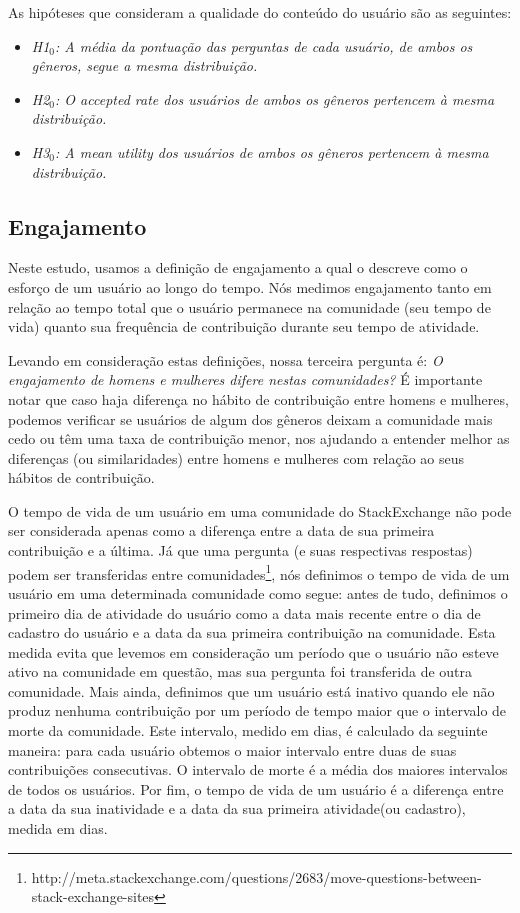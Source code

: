 
As hipóteses que consideram a qualidade do conteúdo do usuário são as seguintes:

\begin{itemize}
    \item \textit{H1$_0$: A média da pontuação das perguntas de cada usuário, de ambos os gêneros, segue a mesma distribuição.}
    \item \textit{H2$_0$: O accepted rate dos usuários de ambos os gêneros pertencem à mesma distribuição.}
    \item \textit{H3$_0$: A mean utility dos usuários de ambos os gêneros pertencem à mesma distribuição.}
\end{itemize}

\subsection{Engajamento}

Neste estudo, usamos a definição de engajamento a qual o descreve como o esforço de um usuário ao longo do tempo. Nós medimos engajamento tanto em relação ao tempo total que o usuário permanece na comunidade (seu tempo de vida) quanto sua frequência de contribuição durante seu tempo de atividade.

Levando em consideração estas definições, nossa terceira pergunta é: \textit{O engajamento de homens e mulheres difere nestas comunidades?} É importante notar que caso haja diferença no hábito de contribuição entre homens e mulheres, podemos verificar se usuários de algum dos gêneros deixam a comunidade mais cedo ou têm uma taxa de contribuição menor, nos ajudando a entender melhor as diferenças (ou similaridades) entre homens e mulheres com relação ao seus hábitos de contribuição.

O tempo de vida de um usuário em uma comunidade do StackExchange não pode ser considerada apenas como a diferença entre a data de sua primeira contribuição e a última. Já que uma pergunta (e suas respectivas respostas) podem ser transferidas entre comunidades\footnote{http://meta.stackexchange.com/questions/2683/move-questions-between-stack-exchange-sites}, nós definimos o tempo de vida de um usuário em uma determinada comunidade como segue: antes de tudo, definimos o primeiro dia de atividade do usuário como a data mais recente entre o dia de cadastro do usuário e a data da sua primeira contribuição na comunidade. Esta medida evita que levemos em consideração um período que o usuário não esteve ativo na comunidade em questão, mas sua pergunta foi transferida de outra comunidade. Mais ainda, definimos que um usuário está inativo quando ele não produz nenhuma contribuição por um período de tempo maior que o intervalo de morte da comunidade. Este intervalo, medido em dias, é calculado da seguinte maneira: para cada usuário obtemos o maior intervalo entre duas de suas contribuições consecutivas. O intervalo de morte é a média dos maiores intervalos de todos os usuários. Por fim, o tempo de vida de um usuário é a diferença entre a data da sua inatividade e a data da sua primeira atividade(ou cadastro), medida em dias.

